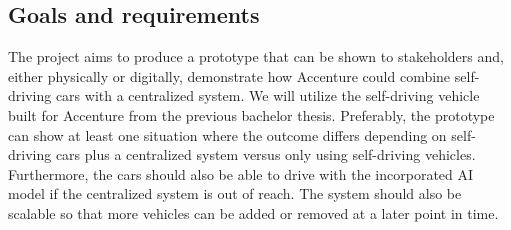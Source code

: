 \subsection{Goals and requirements}\label{sec:goals}
The project aims to produce a prototype that can be shown to stakeholders and, either physically or digitally, demonstrate how Accenture could combine self-driving cars with a centralized system. We will utilize the self-driving vehicle built for Accenture from the previous bachelor thesis. Preferably, the prototype can show at least one situation where the outcome differs depending on self-driving cars plus a centralized system versus only using self-driving vehicles. Furthermore, the cars should also be able to drive with the incorporated AI model if the centralized system is out of reach. The system should also be scalable so that more vehicles can be added or removed at a later point in time. 
